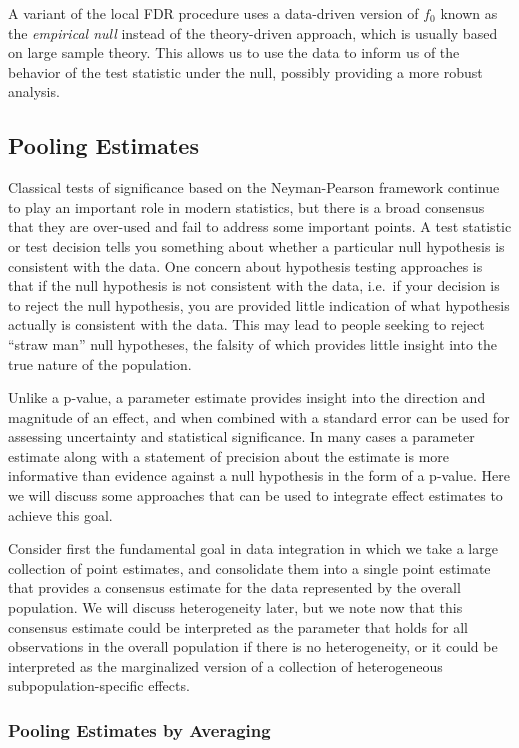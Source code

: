A variant of the local FDR procedure uses a data-driven version of $f_0$ known as the \textit{empirical null} instead of the theory-driven approach, which is usually based on large sample theory. This allows us to use the data to inform us of the behavior of the test statistic under the null, possibly providing a more robust analysis.

\subsection{Pooling Estimates}

Classical tests of significance based on the Neyman-Pearson framework continue to play an important role in modern statistics, but there is a broad consensus that they are over-used and fail to address some important points. A test statistic or test decision tells you something about whether a particular null hypothesis is consistent with the data. One concern about hypothesis testing approaches is that if the null hypothesis is not consistent with the data, i.e.\ if your decision is to reject the null hypothesis, you are provided little indication of what hypothesis actually is consistent with the data. This may lead to people seeking to reject ``straw man'' null hypotheses, the falsity of which provides little insight into the true nature of the population.

Unlike a p-value, a parameter estimate provides insight into the direction and magnitude of an effect, and when combined with a standard error can be used for assessing uncertainty and statistical significance. In many cases a parameter estimate along with a statement of precision about the estimate is more informative than evidence against a null hypothesis in the form of a p-value. Here we will discuss some approaches that can be used to integrate effect estimates to achieve this goal.

Consider first the fundamental goal in data integration in which we take a large collection of point estimates, and consolidate them into a single point estimate that provides a consensus estimate for the data represented by the overall population. We will discuss heterogeneity later, but we note now that this consensus estimate could be interpreted as the parameter that holds for all observations in the overall population if there is no heterogeneity, or it could be interpreted as the marginalized version of a collection of heterogeneous subpopulation-specific effects.

\subsubsection{Pooling Estimates by Averaging}

